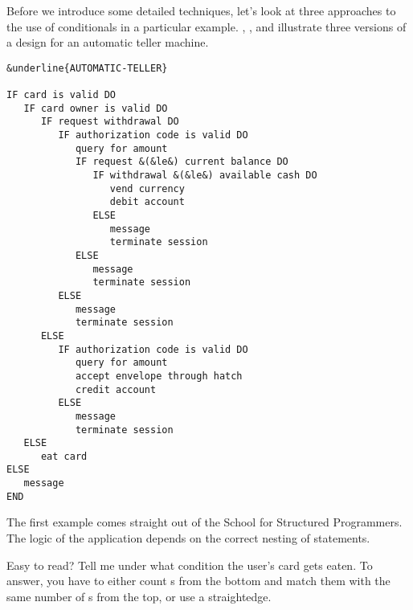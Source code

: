 %
Before we introduce some detailed techniques, let's look at three
approaches to the use of conditionals in a particular example.
, , and  illustrate three versions of
a design for an automatic teller machine.

\begin{figure*}[tttt]
\begin{center}
\small\begin{BVerbatim}[commandchars=\&\{\},baselinestretch=0.85]
&underline{AUTOMATIC-TELLER}

IF card is valid DO
   IF card owner is valid DO
      IF request withdrawal DO
         IF authorization code is valid DO
            query for amount
            IF request &(&le&) current balance DO
               IF withdrawal &(&le&) available cash DO
                  vend currency
                  debit account
               ELSE
                  message
                  terminate session
            ELSE
               message
               terminate session
         ELSE
            message
            terminate session
      ELSE
         IF authorization code is valid DO
            query for amount
            accept envelope through hatch
            credit account
         ELSE
            message
            terminate session
   ELSE
      eat card
ELSE
   message
END
\end{BVerbatim}
\end{center}
\end{figure*}
The first example comes straight out of the School for Structured
Programmers. The logic of the application depends on the correct nesting
of  statements.

Easy to read? Tell me under what condition the user's card gets eaten. To
answer, you have to either count s from the bottom and match
them with the same number of s from the top, or use a
straightedge.

